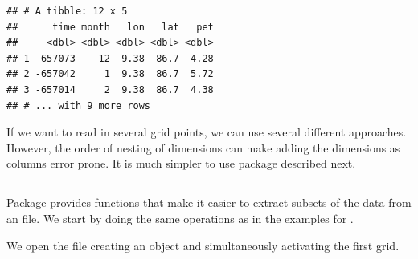 \documentclass[krantz2]{krantz}\usepackage{knitr}
\begin{document}
\begin{knitrout}\footnotesize
{}\color{fgcolor}\begin{kframe}
\begin{alltt}
 \hlkwb{<-}
    \hlstd{(} \hlstd{=}  \hlstd{),}
            \hlstd{=} \hlstd{(}\hlstd{(}\hlstd{)} \hlopt{+} 
            \hlstd{= longitude[}\hlstd{],}
            \hlstd{= latitude[}\hlstd{],}
            \hlstd{=}  \hlstd{)[}\hlstd{,} \hlstd{, ]}
           \hlstd{)}
\end{alltt}
\begin{verbatim}
## # A tibble: 12 x 5
##      time month   lon   lat   pet
##     <dbl> <dbl> <dbl> <dbl> <dbl>
## 1 -657073    12  9.38  86.7  4.28
## 2 -657042     1  9.38  86.7  5.72
## 3 -657014     2  9.38  86.7  4.38
## # ... with 9 more rows
\end{verbatim}
\end{kframe}
\end{knitrout}

If we want to read in several grid points, we can use several different approaches. However, the order of nesting of dimensions can make adding the dimensions as columns error prone. It is much simpler to use package  described next.

\subsection[tidync]{}



Package  provides functions that make it easier to extract subsets of the data from an  file. We start by doing the same operations as in the examples for .

We open the file creating an object and simultaneously activating the first grid.
\end{document}
